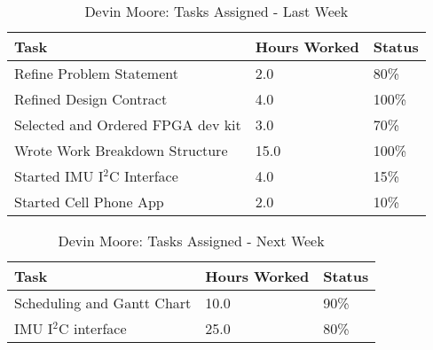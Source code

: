 \documentclass[12pt,compsoc]{IEEEtran}
\begin{document}
	\begin{table}[ht]
	\renewcommand{\arraystretch}{1.3}
		\caption{Devin Moore: Tasks Assigned - Last Week}
		
		\label{Summary of Devin Moore's activities: last week}
		
		\centering
		\begin{tabular}{p{5.5cm}|p{1cm}|p{1cm}}

		\hline
		\bfseries 	Task		 		                    & \bfseries Hours Worked	& \bfseries Status	\\
		\hline\hline
					Refine Problem Statement				& 2.0						& 80\%				\\
					Refined Design Contract					& 4.0						& 100\%				\\
					Selected and Ordered FPGA dev kit		& 3.0						& 70\%				\\
					Wrote Work Breakdown Structure			& 15.0						& 100\%				\\
					Started IMU I$^2$C Interface				& 4.0						& 15\%				\\
					Started Cell Phone App					& 2.0						& 10\%				\\
		\hline
		\end{tabular}
	\end{table}

	\begin{table}[ht]
	\renewcommand{\arraystretch}{1.3}
		\caption{Devin Moore: Tasks Assigned - Next Week}
		
		\label{Summary of Devin Moore's activites: this week}
		
		\centering
		\begin{tabular}{p{5.5cm}|p{1cm}|p{1cm}}

		\hline
		\bfseries 	Task		 		            & \bfseries Hours Worked	& \bfseries Status	\\
		\hline\hline
			    	Scheduling and Gantt Chart	    & 10.0						& 90\%				\\
                    IMU I$^2$C interface               & 25.0                      & 80\%              \\
                    \hline
		\end{tabular}
	\end{table}

\end{document}
